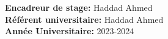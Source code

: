 \begin{titlepage}
\begin{center}
        \vfill

        
        
        
        
        \textbf{Encadreur de stage: } Haddad Ahmed \\        
        \textbf{Référent universitaire: } Haddad Ahmed \\
        \textbf{Année Universitaire: } 2023-2024
        
    \end{center}
\end{titlepage}